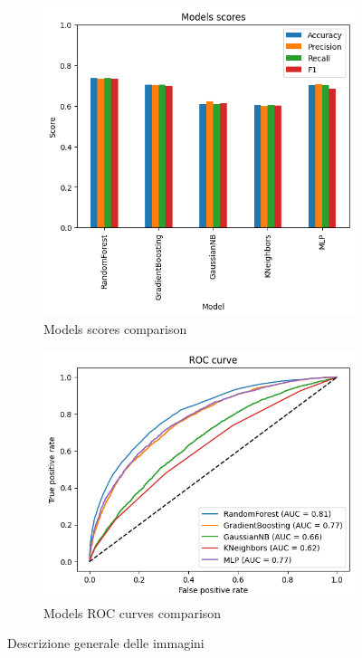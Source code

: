 \begin{figure}[H]
    \centering
    \begin{subfigure}{0.45\textwidth}
      \centering
      \includegraphics[width=\textwidth]{images/models_scores.png}
      \caption{Models scores comparison}
      \label{fig:immagine1}
    \end{subfigure}
    \hfill
    \begin{subfigure}{0.45\textwidth}
      \centering
      \includegraphics[width=\textwidth]{images/roc_curves.png}
      \caption{Models ROC curves comparison}
      \label{fig:immagine2}
    \end{subfigure}
    \caption{Descrizione generale delle immagini}
    \label{fig:immagini}
  \end{figure}